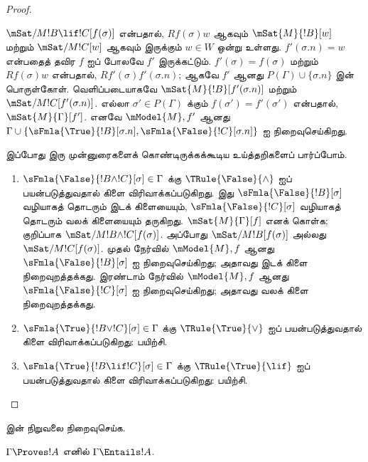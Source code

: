 \documentclass[../../../include/open-logic-section]{subfiles}
\begin{document}
\begin{proof}
\begin{enumerate}
  $\mSat/{M}{!B \lif !C}[f(\sigma)]$ என்பதால்,
  $Rf(\sigma)w$ ஆகவும் $\mSat{M}{!B}[w]$ மற்றும்
  $\mSat/{M}{!C}[w]$ ஆகவும் இருக்கும் $w \in W$ ஒன்று உள்ளது.
  $f'(\sigma.n) = w$ என்பதைத் தவிர $f$ ஐப் போலவே $f'$ இருக்கட்டும்.
  $f'(\sigma) = f(\sigma)$ மற்றும் $Rf(\sigma)w$ என்பதால்,
  $Rf'(\sigma)f'(\sigma.n)$; ஆகவே $f'$ ஆனது $P(\Gamma) \cup
  \{\sigma.n\}$ இன் பொருள்கோள். வெளிப்படையாகவே
  $\mSat{M}{!B}[f'(\sigma.n)]$ மற்றும்
  $\mSat/{M}{!C}[f'(\sigma.n)]$. எல்லா $\sigma' \in P(\Gamma)$ க்கும்
  $f(\sigma') = f'(\sigma')$ என்பதால், $\mSat{M}{\Gamma}[f']$.
  எனவே $\mModel{M}, f'$ ஆனது $\Gamma \cup
  \{\sFmla{\True}{!B}[\sigma.n], \sFmla{\False}{!C}[\sigma.n]\}$ ஐ
  நிறைவுசெய்கிறது.
\end{enumerate}
இப்போது இரு முன்னுரைகளைக் கொண்டிருக்கக்கூடிய உய்த்தறிகளைப் பார்ப்போம்.
\begin{enumerate}
\item $\sFmla{\False}{!B \land !C}[\sigma] \in \Gamma$ க்கு
  $\TRule{\False}{\land}$ ஐப் பயன்படுத்துவதால் கிளை விரிவாக்கப்படுகிறது.
  இது $\sFmla{\False}{!B}[\sigma]$ வழியாகத் தொடரும் இடக் கிளையையும்,
  $\sFmla{\False}{!C}[\sigma]$ வழியாகத் தொடரும் வலக் கிளையையும் தருகிறது.
  $\mSat{M}{\Gamma}[f]$ எனக் கொள்க; குறிப்பாக
  $\mSat/{M}{!B \land !C}[f(\sigma)]$. அப்போது
  $\mSat/{M}{!B}[f(\sigma)]$ அல்லது $\mSat/{M}{!C}[f(\sigma)]$. முதல்
  நேர்வில் $\mModel{M}, f$ ஆனது $\sFmla{\False}{!B}[\sigma]$ ஐ
  நிறைவுசெய்கிறது; அதாவது இடக் கிளை நிறைவுறத்தக்கது. இரண்டாம் நேர்வில்
  $\mModel{M}, f$ ஆனது $\sFmla{\False}{!C}[\sigma]$ ஐ நிறைவுசெய்கிறது;
  அதாவது வலக் கிளை நிறைவுறத்தக்கது.
\item $\sFmla{\True}{!B \lor !C}[\sigma] \in \Gamma$ க்கு
    $\TRule{\True}{\lor}$ ஐப் பயன்படுத்துவதால் கிளை விரிவாக்கப்படுகிறது:
    பயிற்சி.
\item $\sFmla{\True}{!B \lif !C}[\sigma] \in \Gamma$ க்கு
    $\TRule{\True}{\lif}$ ஐப் பயன்படுத்துவதால் கிளை விரிவாக்கப்படுகிறது:
    பயிற்சி.
\end{enumerate}
\end{proof}

\begin{prob}
 இன் நிறுவலை நிறைவுசெய்க.
\end{prob}

\begin{cor}
$\Gamma \Proves !A$ எனில் $\Gamma \Entails !A$.
\end{cor}
\end{document}

